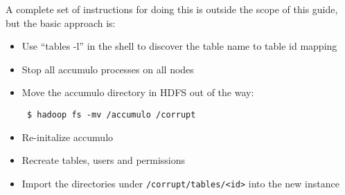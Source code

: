 A complete set of instructions for doing this is outside the scope of this guide,
but the basic approach is:

\begin{itemize}
 \item Use ``tables -l'' in the shell to discover the table name to table id mapping
 \item Stop all accumulo processes on all nodes
 \item Move the accumulo directory in HDFS out of the way:
\small
\begin{verbatim}
 $ hadoop fs -mv /accumulo /corrupt
\end{verbatim}
\normalsize
 \item Re-initalize accumulo
 \item Recreate tables, users and permissions
 \item Import the directories under \texttt{/corrupt/tables/<id>} into the new instance
\end{itemize}
